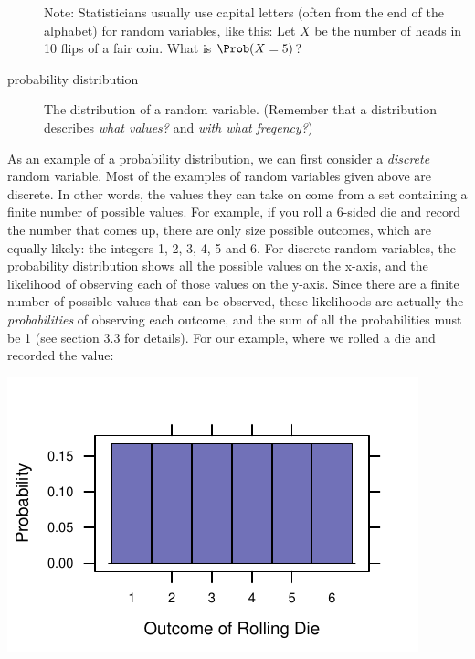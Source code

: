 \documentclass[twoside]{book}\usepackage[]{graphicx}\usepackage[]{xcolor}
\makeatletter
\def\maxwidth{ %
  \ifdim\Gin@nat@width>\linewidth
    \linewidth
  \else
    \Gin@nat@width
  \fi
}
\newenvironment{knitrout}{}{} %
\newcounter{example}[section]
\makeatother
\begin{document}
\begin{description}
Note: Statisticians usually use capital letters (often from the end of the alphabet)
for random variables, like this:  
Let $X$ be the number of heads in 10 flips of a fair coin.  What is $\Prob(X=5)$?


\item[probability distribution]
The distribution of a random variable.
(Remember that a distribution describes \emph{what values?} and 
\emph{with what freqency?})
\end{description}

As an example of a probability distribution, we can first consider a \emph{discrete} random variable.  Most of the examples of random variables given above are discrete. In other words, the values they can take on come from a set containing a finite number of possible values.  For example, if you roll a 6-sided die and record the number that comes up, there are only size possible outcomes, which are equally likely: the integers 1, 2, 3, 4, 5 and 6.  For discrete random variables, the probability distribution shows all the possible values on the x-axis, and the likelihood of observing each of those values on the y-axis.  Since there are a finite number of possible values that can be observed, these likelihoods are actually the \emph{probabilities} of observing each outcome, and the sum of all the probabilities must be 1 (see section 3.3 for details).  For our example, where we rolled a die and recorded the value:

\begin{knitrout}
\color{fgcolor}

{\centering \includegraphics[width=\maxwidth]{figures/fig-discrete_pmf-1} 

}



\end{knitrout}
\end{document}
